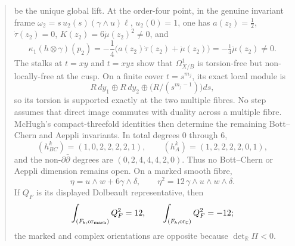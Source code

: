 \documentclass[11pt,letterpaper]{article}
\theoremstyle{definition}
\theoremstyle{remark}
\begin{document}
\begin{abstract}
\[ \]
 be the unique global lift.  At the order-four point, in the genuine
 invariant frame
 \(\omega_2=s\,u_2(s)(\gamma\wedge u)\ell\), \(u_2(0)=1\), one has
 \(a(z_2)=\tfrac12\), \(\dot\tau(z_2)=0\),
 \(K(z_2)=6\dot\mu(z_2)^2\ne0\), and
 \[
  \kappa_1(h\otimes\gamma)(p_2)
  =-\frac14\bigl(a(z_2)\dot\tau(z_2)+\dot\mu(z_2)\bigr)
  =-\tfrac14\dot\mu(z_2)\ne0.
 \]
 The stalks at \(t=xy\) and \(t=xyz\) show that
 \(\Omega^1_{X/B}\) is torsion-free but non-locally-free at the cusp.  On a
 finite cover \(t=s^{m_j}\), its exact local module is
 \[
  R\,dy_1\oplus R\,dy_2\oplus
  \bigl(R/(s^{m_j-1})\bigr)ds,
 \]
 so its torsion is supported exactly at the two multiple fibres.  No step
 assumes that direct image commutes with duality across a multiple fibre.
McHugh's compact-threefold identities then determine the remaining
Bott--Chern and Aeppli invariants.  In total degrees $0$ through $6$,
\[
(h^k_{BC})=(1,0,2,2,2,2,1),\qquad
(h^k_A)=(1,2,2,2,2,0,1),
\]
and the non-$\partial\bar\partial$ degrees are
$(0,2,4,4,4,2,0)$.  Thus no Bott--Chern or Aeppli dimension remains open.
On a marked smooth fibre,
\[
 \eta=u\wedge w+6\gamma\wedge\delta,\qquad
 \eta^2=12\,\gamma\wedge u\wedge w\wedge\delta.
\]
If \(Q_F\) is its displayed Dolbeault representative, then
\[
 \int_{(F_b,\mathrm{or}_{\rm mark})}Q_F^2=12,\qquad
 \int_{(F_b,\mathrm{or}_{\mathbb C})}Q_F^2=-12;
\]
the marked and complex orientations are opposite because
\(\det_{\mathbb R}\Pi<0\).


\end{abstract}
\end{document}
